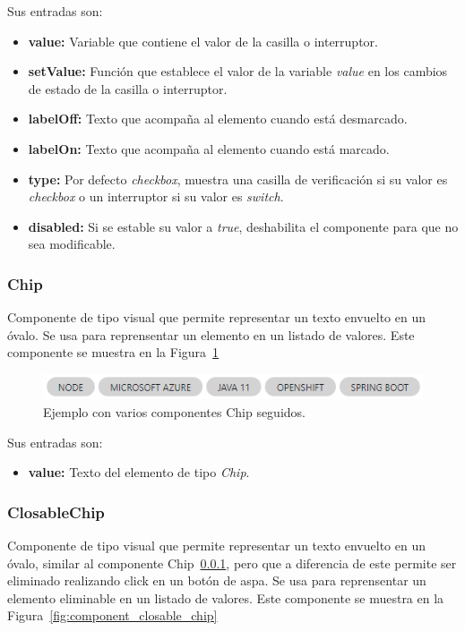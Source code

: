 \documentclass[a4paper, 12pt]{book}
\begin{document}
Sus entradas son:

		\begin{itemize}
		\item \textbf{value:} Variable que contiene el valor de la casilla o interruptor.
		\item \textbf{setValue:} Función que establece el valor de la variable \emph{value} en los cambios de estado de la casilla o interruptor.
		\item \textbf{labelOff:} Texto que acompaña al elemento cuando está desmarcado.
		\item \textbf{labelOn:} Texto que acompaña al elemento cuando está marcado.
		\item \textbf{type:} Por defecto \emph{checkbox}, muestra una casilla de verificación si su valor es \emph{checkbox} o un interruptor si su valor es \emph{switch}.
		\item \textbf{disabled:} Si se estable su valor a \emph{true}, deshabilita el componente para que no sea modificable.
		\end{itemize}

\subsubsection{Chip}
\label{subsec:wc_chip}
Componente de tipo visual que permite representar un texto envuelto en un óvalo. Se usa para reprensentar un elemento en un listado de valores.
Este componente se muestra en la Figura~\ref{fig:component_chip}

\begin{figure}
  \centering
  \includegraphics[width=12cm, keepaspectratio]{img/Chip.PNG}
  \caption{Ejemplo con varios componentes Chip seguidos.}\label{fig:component_chip}
\end{figure}

Sus entradas son:

		\begin{itemize}
		\item \textbf{value:} Texto del elemento de tipo \emph{Chip}.
		\end{itemize}

\subsubsection{ClosableChip}
\label{subsec:wc_closable_chip}
Componente de tipo visual que permite representar un texto envuelto en un óvalo, similar al componente Chip~\ref{subsec:wc_chip}, pero que a diferencia de este permite ser eliminado realizando click en un botón de aspa.
Se usa para reprensentar un elemento eliminable en un listado de valores.
Este componente se muestra en la Figura~\ref{fig:component_closable_chip}
\end{document}
